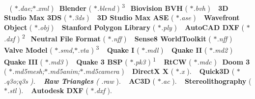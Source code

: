  ~\newline
{ ( {\itshape $\ast$.dae;$\ast$.xml} )~\newline
 {\bfseries Blender} ( {\itshape $\ast$.blend} ) \textsuperscript{3}~\newline
 {\bfseries Biovision B\+V\+H } ( {\itshape $\ast$.bvh} ) ~\newline
 {\bfseries 3\+D Studio Max 3\+D\+S} ( {\itshape $\ast$.3ds} ) ~\newline
 {\bfseries 3\+D Studio Max A\+S\+E} ( {\itshape $\ast$.ase} ) ~\newline
 {\bfseries Wavefront Object} ( {\itshape $\ast$.obj} ) ~\newline
 {\bfseries Stanford Polygon Library} ( {\itshape $\ast$.ply} ) ~\newline
 {\bfseries Auto\+C\+A\+D D\+X\+F} ( {\itshape $\ast$.dxf} ) \textsuperscript{2}~\newline
 {\bfseries Neutral File Format} ( {\itshape $\ast$.nff} ) ~\newline
 {\bfseries Sense8 World\+Toolkit} ( {\itshape $\ast$.nff} ) ~\newline
 {\bfseries Valve Model} ( {\itshape $\ast$.smd,$\ast$.vta} ) \textsuperscript{3} ~\newline
 {\bfseries Quake I} ( {\itshape $\ast$.mdl} ) ~\newline
 {\bfseries Quake I\+I} ( {\itshape $\ast$.md2} ) ~\newline
 {\bfseries Quake I\+I\+I} ( {\itshape $\ast$.md3} ) ~\newline
 {\bfseries Quake 3 B\+S\+P} ( {\itshape $\ast$.pk3} ) \textsuperscript{1} ~\newline
 {\bfseries Rt\+C\+W} ( {\itshape $\ast$.mdc} )~\newline
 {\bfseries Doom 3} ( {\itshape $\ast$.md5mesh;$\ast$.md5anim;$\ast$.md5camera} ) ~\newline
 {\bfseries Direct\+X X } ( {\itshape $\ast$.x} ). ~\newline
 {\bfseries Quick3\+D } ( {\itshape $\ast$.q3o;{\itshape q3s} ). ~\newline
 {\bfseries Raw Triangles } ( {\itshape }.raw} ). ~\newline
 {\bfseries A\+C3\+D } ( {\itshape $\ast$.ac} ). ~\newline
 {\bfseries Stereolithography } ( {\itshape $\ast$.stl} ). ~\newline
 {\bfseries Autodesk D\+X\+F } ( {\itshape $\ast$.dxf} ). ~\newline
}
